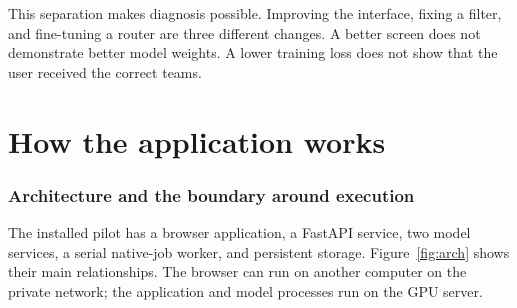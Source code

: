 \documentclass[11pt,a4paper]{article}
\begin{document}
This separation makes diagnosis possible. Improving the interface, fixing a
filter, and fine-tuning a router are three different changes. A better screen
does not demonstrate better model weights. A lower training loss does not show
that the user received the correct teams.

\part{How the application works}

\section{Architecture and the boundary around execution}
\label{sec:architecture}

The installed pilot has a browser application, a FastAPI service, two model
services, a serial native-job worker, and persistent storage. Figure~\ref{fig:arch}
shows their main relationships. The browser can run on another computer on the
private network; the application and model processes run on the GPU server.
\end{document}

